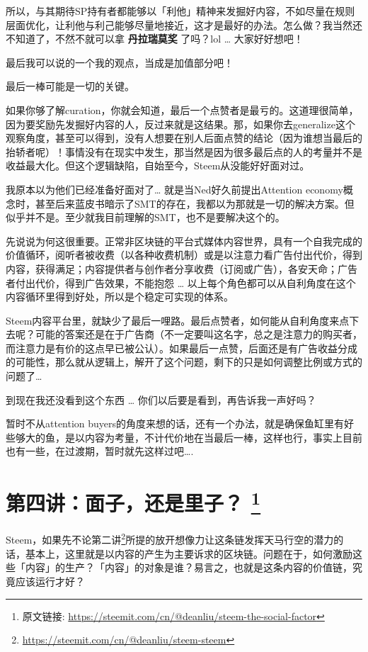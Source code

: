 \documentclass[]{ctexbook}
\renewcommand{\href}[2]{#2\footnote{\url{#1}}}
\begin{document}
所以，与其期待SP持有者都能够以「利他」精神来发掘好内容，不如尽量在规则层面优化，让利他与利己能够尽量地接近，这才是最好的办法。怎么做？我当然还不知道了，不然不就可以拿 \textbf{丹拉瑞莫奖} 了吗？lol \ldots{} 大家好好想吧！

最后我可以说的一个我的观点，当成是加值部分吧！

最后一棒可能是一切的关键。

如果你够了解curation，你就会知道，最后一个点赞者是最亏的。这道理很简单，因为要奖励先发掘好内容的人，反过来就是这结果。那，如果你去generalize这个观察角度，甚至可以得到，没有人想要在别人后面点赞的结论（因为谁想当最后的抬轿者呢）！事情没有在现实中发生，那当然是因为很多最后点的人的考量并不是收益最大化。但这个逻辑缺陷，自始至今，Steem从没能好好面对过。

我原本以为他们已经准备好面对了\ldots{} 就是当Ned好久前提出Attention economy概念时，甚至后来蓝皮书暗示了SMT的存在，我都以为那就是一切的解决方案。但似乎并不是。至少就我目前理解的SMT，也不是要解决这个的。

先说说为何这很重要。正常非区块链的平台式媒体内容世界，具有一个自我完成的价值循环，阅听者被收费（以各种收费机制）或是以注意力看广告付出代价，得到内容，获得满足；内容提供者与创作者分享收费（订阅或广告），各安天命；广告者付出代价，得到广告效果，不能抱怨 \ldots{} 以上每个角色都可以从自利角度在这个内容循环里得到好处，所以是个稳定可实现的体系。

Steem内容平台里，就缺少了最后一哩路。最后点赞者，如何能从自利角度来点下去呢？可能的答案还是在于广告商（不一定要叫这名字，总之是注意力的购买者，而注意力是有价的这点早已被公认）。如果最后一点赞，后面还是有广告收益分成的可能性，那么就从逻辑上，解开了这个问题，剩下的只是如何调整比例或方式的问题了\ldots{}

到现在我还没看到这个东西 \ldots{} 你们以后要是看到，再告诉我一声好吗？

暂时不从attention buyers的角度来想的话，还有一个办法，就是确保鱼缸里有好些够大的鱼，是以内容为考量，不计代价地在当最后一棒，这样也行，事实上目前也有一些，在过渡期，暂时就先这样过吧\ldots{}.

\hypertarget{deanliu4}{%
\section[第四讲：面子，还是里子？ ]{\texorpdfstring{第四讲：面子，还是里子？ \footnote{原文链接: \url{https://steemit.com/cn/@deanliu/steem-the-social-factor}}}{第四讲：面子，还是里子？ }}\label{deanliu4}}

Steem，如果先不论\href{https://steemit.com/cn/@deanliu/steem-steem}{第二讲}所提的放开想像力让这条链发挥天马行空的潜力的话，基本上，这里就是以内容的产生为主要诉求的区块链。问题在于，如何激励这些「内容」的生产？「内容」的对象是谁？易言之，也就是这条内容的价值链，究竟应该运行才好？
\end{document}
